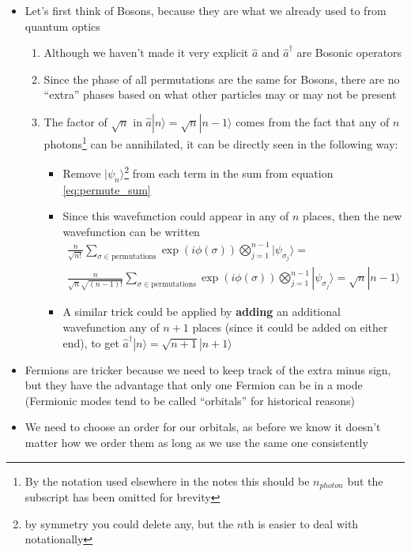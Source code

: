 \documentclass[english]{article}
\newcommand{\ket}[1]{|#1 \rangle}
\begin{document}
\begin{itemize}
\section{Bosonic and Fermionic operators}
\item Let's first think of Bosons, because they are what we already used to from quantum optics
\begin{enumerate}
\item Although we haven't made it very explicit $\hat{a}$ and $\hat{a}^\dagger$ are Bosonic operators
\item Since the phase of all permutations are the same for Bosons, there are no ``extra'' phases based on what other particles may or may not be present
\item The factor of $\sqrt{n}$ in $\hat{a}\ket{n}=\sqrt{n}\ket{n-1}$ comes from the fact that any of $n$ photons\footnote{By the notation used elsewhere in the notes this should be $n_{photon}$ but the subscript has been omitted for brevity} can be annihilated, it can be directly seen in the following way:
\begin{itemize}
\item Remove $\ket{\psi_n}$\footnote{by symmetry you could delete any, but the $n$th is easier to deal with notationally} from each term in the sum  from equation \ref{eq:permute_sum}
\item Since this wavefunction could appear in any of $n$ places, then the new wavefunction can be written 
\begin{align}
\frac{n}{\sqrt{n!}}\sum_{\sigma \in \mathrm{permutations}}\exp(i\phi(\sigma))\bigotimes^{n-1}_{j=1}  \ket{\psi_{\sigma_j}}=\\
\frac{n}{\sqrt{n}\sqrt{(n-1)!}}\sum_{\sigma \in \mathrm{permutations}}\exp(i\phi(\sigma))\bigotimes^{n-1}_{j=1}  \ket{\psi_{\sigma_j}}=\sqrt{n}\ket{n-1}
\end{align}
\item A similar trick could be applied by \textbf{adding} an additional wavefunction any of $n+1$ places (since it could be added on either end), to get $\hat{a}^\dagger\ket{n}=\sqrt{n+1}\ket{n+1}$
\end{itemize}
\end{enumerate}
\item Fermions are tricker because we need to keep track of the extra minus sign, but they have the advantage that only one  Fermion can be in a mode (Fermionic modes tend to be called ``orbitals'' for historical reasons)
\item We need to choose an order for our orbitals, as before we know it doesn't matter how we order them as long as we use the same one consistently

\end{itemize}
\end{document}
